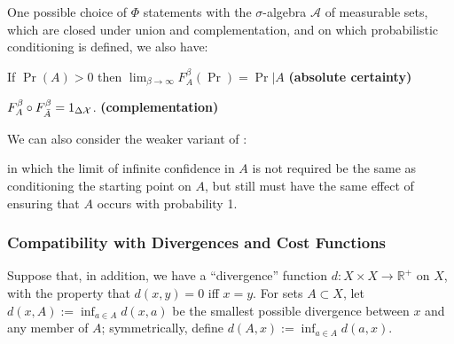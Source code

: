 \documentclass{article}
\DeclareMathOperator{\supp}{\mathrm{Supp}}
\begin{document}
\begin{wip}

One possible choice of $\Phi$ statements with the $\sigma$-algebra $\mathcal A$ of measurable sets, which are closed under union and complementation, and on which probabilistic conditioning is defined, we also have:

\begin{URaxioms}
    \item If $\Pr(A) > 0$ then $\displaystyle \lim_{\beta\to\infty} F^\beta_A (\Pr) = \Pr|A$
    \hfill \textbf{(absolute certainty)} \label{ax:certainty}


    \item
    $F^\beta_A \circ F_{\bar A}^\beta = 1_{\Delta\mathcal X}$.
        \hfill \textbf{(complementation)} \label{ax:comp}
\end{URaxioms}


We can also consider the weaker variant of :
in which the limit of infinite confidence in $A$ is not required be the same as conditioning the starting point on $A$, but still must have the same effect of ensuring that $A$ occurs with probability 1.



\subsubsection*{Compatibility with Divergences and Cost Functions}
Suppose that, in addition, we have a ``divergence'' function $d : X \times X \to \mathbb R^+$ on $X$, with the property that $d(x,y) = 0$ iff $x = y$.
For sets $A \subset X$, let $d(x, A) := \inf_{a \in A} d(x,a)$ be the smallest possible divergence between $x$ and any member of $A$; symmetrically, define $d(A, x) := \inf_{a \in A} d(a,x)$.


\end{wip}
\end{document}
